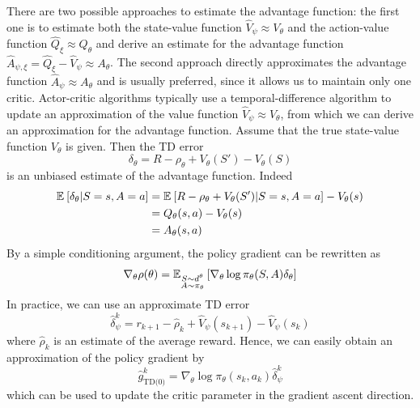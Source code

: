 There are two possible approaches to estimate the advantage function: the first one is to estimate both the state-value function $\widehat{V}_\psi \approx V_\theta$ and the action-value function $\widehat{Q}_\xi \approx Q_\theta$ and derive an estimate for the advantage function $\widehat{A}_{\psi, \xi} = \widehat{Q}_\xi - \widehat{V}_\psi \approx A_\theta$. The second approach directly approximates the advantage function $\widehat{A}_\psi \approx A_\theta$ and is usually preferred, since it allows us to maintain only one critic. Actor-critic algorithms typically use a temporal-difference algorithm to update an approximation of the value function $\widehat{V}_\psi \approx V_\theta$, from which we can derive an approximation for the advantage function. Assume that the true state-value function $V_\theta$ is given. Then the TD error 
\begin{equation}
	\delta_\theta = R - \rho_\theta + V_\theta(S') - V_\theta(S)
\end{equation}
is an unbiased estimate of the advantage function. Indeed 
\begin{equation*}
	\begin{split}
		\E{\delta_\theta | S = s, A = a} &= \E{R - \rho_\theta + V_\theta(S') | S = s, A = a} - V_\theta(s)\\
		&= Q_\theta(s,a) - V_\theta(s)\\
		&= A_\theta(s,a)  
	\end{split}
\end{equation*}
By a simple conditioning argument, the policy gradient can be rewritten as
\begin{equation}
	\nabla_\theta \rho(\theta) =
			\E[\substack{S \sim d^\theta\\A \sim \pi_\theta}]{\nabla_\theta\log
			\pi_\theta(S,A) \delta_\theta}
\end{equation} 
In practice, we can use an approximate TD error 
\begin{equation}
\label{eq:td_error}
	\widehat{\delta}_\psi^k = r_{k+1} - \widehat{\rho}_k + \widehat{V}_\psi(s_{k+1}) - \widehat{V}_\psi(s_k) 
\end{equation}
where $\widehat{\rho}_k$ is an estimate of the average reward. Hence, we can easily obtain an approximation of the policy gradient by
\begin{equation}
	\widehat{g}_\text{TD(0)}^k = \nabla_\theta\log \pi_\theta(s_k,a_k) \widehat{\delta}_\psi^k
\end{equation}
which can be used to update the critic parameter in the gradient ascent direction. 
